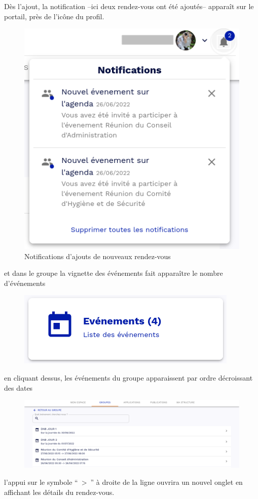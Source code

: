 Dès l'ajout, la notification --ici deux rendez-vous ont été ajoutés-- apparaît sur le portail, près de l'icône du profil.
\begin{figure}
	\centering
	\includegraphics[width=0.500\linewidth]{./Captures/portail.agenda.notification.png}
	\caption{Notifications d'ajouts de nouveaux rendez-vous}
\end{figure}
et dans le groupe la vignette des événements fait apparaître le nombre d'événements
\begin{figure}
	\centering
	\includegraphics[width=0.250\linewidth]{./Captures/agenda.affichage.evenement.dans.groupe.png}
\end{figure}
en cliquant dessus, les événements du groupe apparaissent par ordre décroissant des dates
\begin{figure}
	\centering
	\includegraphics{./Captures/portail.groupe.evenements.details.png}
\end{figure}
l'appui sur le symbole ``~>~'' à droite de la ligne ouvrira un nouvel onglet en affichant les détails du rendez-vous.